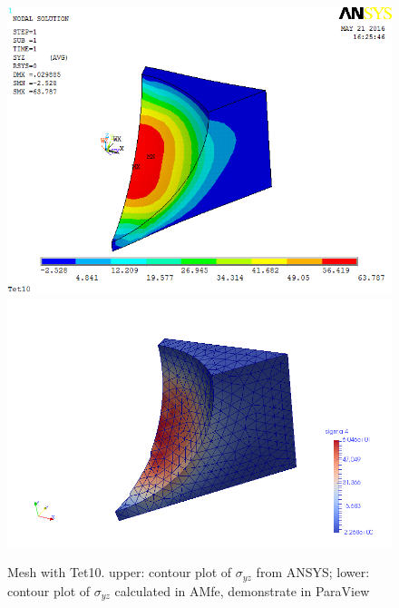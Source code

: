 \begin{figure}[htbp]
	\begin{center}
		\includegraphics[width=13cm,clip]{Tet10_Syz.png} 		
		\includegraphics[width=13cm,clip]{Tet10_Syz_P.png} 		
		\caption{Mesh with Tet10. upper: contour plot of $\sigma_{yz}$ from ANSYS; lower: contour plot of $\sigma_{yz}$ calculated in AMfe, demonstrate in ParaView} \label{fig: Tet10_Syz}
	\end{center}
\end{figure}

